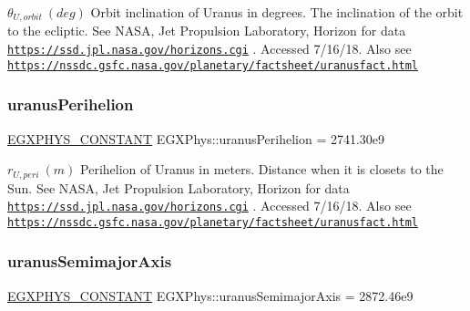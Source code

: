 $ \theta_{U,orbit} \ (deg)$ Orbit inclination of Uranus in degrees. The inclination of the orbit to the ecliptic. See N\+A\+SA, Jet Propulsion Laboratory, Horizon for data \href{https://ssd.jpl.nasa.gov/horizons.cgi}{\tt https\+://ssd.\+jpl.\+nasa.\+gov/horizons.\+cgi} . Accessed 7/16/18. Also see \href{https://nssdc.gsfc.nasa.gov/planetary/factsheet/uranusfact.html}{\tt https\+://nssdc.\+gsfc.\+nasa.\+gov/planetary/factsheet/uranusfact.\+html} \mbox{\label{group___e_g_x_phys-_constants-_astrophysics-_solar_system-_uranus-_orbit_ga74776252e25eeb9c02bc5a69087888b5}} 
\subsubsection{\texorpdfstring{uranus\+Perihelion}{uranusPerihelion}}
{\footnotesize\ttfamily \mbox{\hyperlink{group___e_g_x_phys-_constants-_macros_ga76980d288494ce1714c9ac68a95ba702}{E\+G\+X\+P\+H\+Y\+S\+\_\+\+C\+O\+N\+S\+T\+A\+NT}} E\+G\+X\+Phys\+::uranus\+Perihelion = 2741.\+30e9}

$ r_{U,peri} \ (m)$ Perihelion of Uranus in meters. Distance when it is closets to the Sun. See N\+A\+SA, Jet Propulsion Laboratory, Horizon for data \href{https://ssd.jpl.nasa.gov/horizons.cgi}{\tt https\+://ssd.\+jpl.\+nasa.\+gov/horizons.\+cgi} . Accessed 7/16/18. Also see \href{https://nssdc.gsfc.nasa.gov/planetary/factsheet/uranusfact.html}{\tt https\+://nssdc.\+gsfc.\+nasa.\+gov/planetary/factsheet/uranusfact.\+html} \mbox{\label{group___e_g_x_phys-_constants-_astrophysics-_solar_system-_uranus-_orbit_ga34dc0986eab0b7450cf80dc5b17cd892}} 
\subsubsection{\texorpdfstring{uranus\+Semimajor\+Axis}{uranusSemimajorAxis}}
{\footnotesize\ttfamily \mbox{\hyperlink{group___e_g_x_phys-_constants-_macros_ga76980d288494ce1714c9ac68a95ba702}{E\+G\+X\+P\+H\+Y\+S\+\_\+\+C\+O\+N\+S\+T\+A\+NT}} E\+G\+X\+Phys\+::uranus\+Semimajor\+Axis = 2872.\+46e9}

